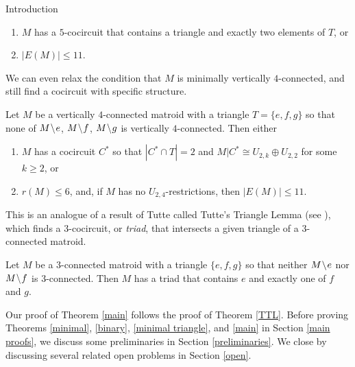 \documentclass[12pt]{amsart}
\begin{document}
\begin{section}{Introduction}
\begin{theorem}
\begin{enumerate}[$(1)$]
\item $M$ has a $5$-cocircuit that contains a triangle and exactly two elements of $T$, or 

\item  $|E(M)| \le 11$.
\end{enumerate}
\end{theorem}




We can even relax the condition that $M$ is minimally vertically $4$-connected, and still find a cocircuit with specific structure. 


\begin{theorem} \label{main}
Let $M$ be a vertically $4$-connected matroid with a triangle $T = \{e,f,g\}$ so that none of $M\!\setminus\! e$, $M \!\setminus\! f$, $M \!\setminus\! g$ is vertically $4$-connected.
Then either
\begin{enumerate}[$(1)$]
\item $M$ has a cocircuit $C^*$ so that $|C^* \cap T| = 2$ and $M|C^* \cong U_{2,k} \oplus U_{2,2}$ for some $k \ge 2$, or

\item $r(M) \le 6$, and, if $M$ has no $U_{2,4}$-restrictions, then $|E(M)| \le 11$. 
\end{enumerate}
\end{theorem}


This is an analogue of a result of Tutte \cite{Tutte} called Tutte's Triangle Lemma (see \cite[Lemma 8.7.7]{Oxley}), which finds a $3$-cocircuit, or \emph{triad}, that intersects a given triangle of a $3$-connected matroid.


\begin{theorem}[Tutte] \label{TTL}
Let $M$ be a $3$-connected matroid with a triangle $\{e,f,g\}$ so that neither $M \!\setminus\! e$ nor $M \!\setminus\! f$ is $3$-connected.
Then $M$ has a triad that contains $e$ and exactly one of $f$ and $g$.
\end{theorem}


Our proof of Theorem \ref{main} follows the proof of Theorem \ref{TTL}.
Before proving Theorems \ref{minimal}, \ref{binary}, \ref{minimal triangle}, and \ref{main} in Section \ref{main proofs}, we discuss some preliminaries in Section \ref{preliminaries}.
We close by discussing several related open problems in Section \ref{open}.
\end{section}








\end{document}
